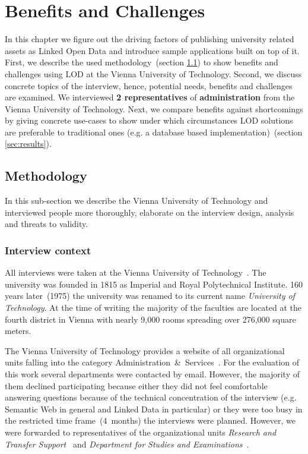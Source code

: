\documentclass{article}
\begin{document}
\section{Benefits and Challenges}
In this chapter we figure out the driving factors of publishing university related assets as Linked Open Data and introduce sample applications built on top of it. First, we describe the used methodology~(section \ref{sec:methodology}) to show benefits and challenges using LOD at the Vienna University of Technology. Second, we discuss concrete topics of the interview, hence, potential needs, benefits and challenges are examined. We interviewed \textbf{2 representatives} of \textbf{administration} from the Vienna University of Technology. Next, we compare benefits against shortcomings by giving concrete use-cases to show under which circumstances LOD solutions are preferable to traditional ones (e.g. a database based implementation)~(section \ref{sec:results}). 

\subsection{Methodology}
\label{sec:methodology}
In this sub-section we describe the Vienna University of Technology and interviewed people more thoroughly, elaborate on the interview design, analysis and threats to validity.
\subsubsection{Interview context}
\label{sec:interview_context}
All interviews were taken at the Vienna University of Technology~\cite{url:university-of-technology-vienna}. The university was founded in 1815 as Imperial and Royal Polytechnical Institute. 160 years later~(1975) the university was renamed to its current name \textit{University of Technology}. At the time of writing the majority of the faculties are located at the fourth district in Vienna with nearly 9,000 rooms spreading over 276,000 square meters. 

The Vienna University of Technology provides a website of all organizational units falling into the category Administration~\&~Services~\cite{url:university-list-of-org-units}. For the evaluation of this work several departments were contacted by email. However, the majority of them declined participating because either they did not feel comfortable answering questions because of the technical concentration of the interview (e.g. Semantic Web in general and Linked Data in particular) or they were too busy in the restricted time frame~(4~months) the interviews were planned. However, we were forwarded to representatives of the organizational units \textit{Research and Transfer Support}~\cite{url:university-research-transfer} and \textit{Department for Studies and Examinations}~\cite{url:university-studies-and-examinations}. 
\end{document}
